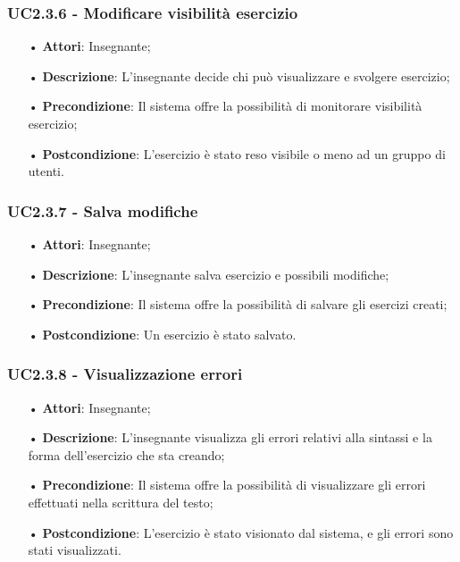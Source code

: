 \subsubsection{UC2.3.6 - Modificare visibilità esercizio}
\begin{itemize}
	\item[•] \textbf{Attori}: Insegnante;
	\item[•] \textbf{Descrizione}: L'insegnante decide chi può visualizzare e svolgere esercizio;
	\item[•] \textbf{Precondizione}: Il sistema offre la possibilità di monitorare visibilità esercizio;
	\item[•] \textbf{Postcondizione}: L’esercizio è stato reso visibile o meno ad un gruppo di utenti.
\end{itemize}

\subsubsection{UC2.3.7 - Salva modifiche}
\begin{itemize}
	\item[•] \textbf{Attori}: Insegnante;
	\item[•] \textbf{Descrizione}: L'insegnante salva esercizio e possibili modifiche;
	\item[•] \textbf{Precondizione}: Il sistema offre la possibilità di salvare gli esercizi creati;
	\item[•] \textbf{Postcondizione}: Un esercizio è stato salvato.
\end{itemize}

\subsubsection{UC2.3.8 - Visualizzazione errori}
\begin{itemize}
	\item[•] \textbf{Attori}: Insegnante;
	\item[•] \textbf{Descrizione}: L'insegnante visualizza gli errori relativi alla sintassi e la forma dell’esercizio che sta creando;
	\item[•] \textbf{Precondizione}: Il sistema offre la possibilità di visualizzare gli errori effettuati nella scrittura del testo;
	\item[•] \textbf{Postcondizione}: L’esercizio è stato visionato dal sistema, e gli errori sono stati visualizzati.
\end{itemize}


